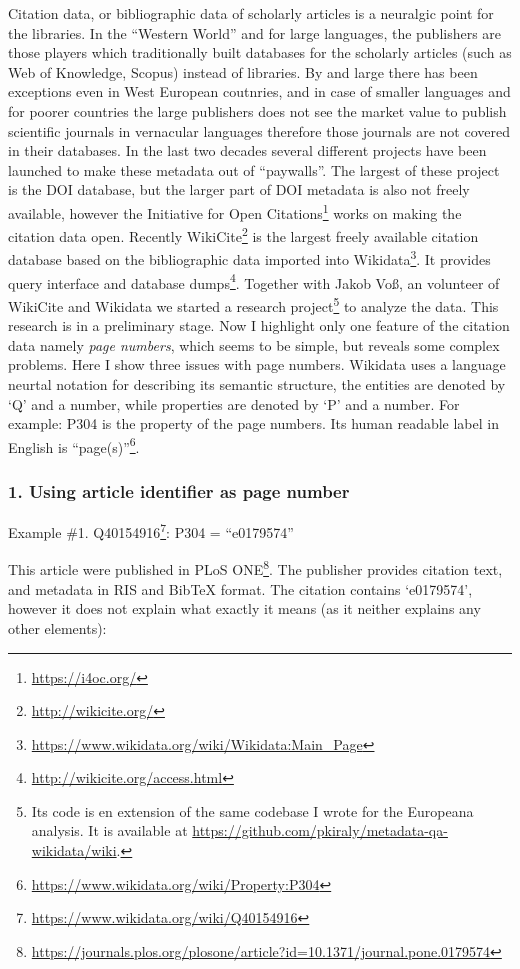 Citation data, or bibliographic data of scholarly articles is a neuralgic point for the libraries. In the ``Western World'' and for large languages, the publishers are those players which traditionally built databases for the scholarly articles (such as Web of Knowledge, Scopus) instead of libraries. By and large there has been exceptions even in West European coutnries, and in case of smaller languages and for poorer countries the large publishers does not see the market value to publish scientific journals in vernacular languages therefore those journals are not covered in their databases. In the last two decades several different projects have been launched to make these metadata out of ``paywalls''. The largest of these project is the DOI database, but the larger part of DOI metadata is also not freely available, however the Initiative for Open Citations\footnote{\url{https://i4oc.org/}} works on making the citation data open. Recently WikiCite\footnote{\url{http://wikicite.org/}} is the largest freely available citation database based on the bibliographic data imported into Wikidata\footnote{\url{https://www.wikidata.org/wiki/Wikidata:Main_Page}}. It provides query interface and database dumps\footnote{\url{http://wikicite.org/access.html}}. Together with Jakob Voß, an volunteer of WikiCite and Wikidata we started a research project\footnote{Its code is en extension of the same codebase I wrote for the Europeana analysis. It is available at \url{https://github.com/pkiraly/metadata-qa-wikidata/wiki}.} to analyze the data. This research is in a preliminary stage. Now I highlight only one feature of the citation data namely \emph{page numbers}, which seems to be simple, but reveals some complex problems. Here I show three issues with page numbers. Wikidata uses a language neurtal notation for describing its semantic structure, the entities are denoted by `Q' and a number, while properties are denoted by `P' and a number. For example: P304 is the property of the page numbers. Its human readable label in English is ``page(s)''\footnote{\url{https://www.wikidata.org/wiki/Property:P304}}.

\subsubsection{1. Using article identifier as page number}

Example \#1. Q40154916\footnote{\url{https://www.wikidata.org/wiki/Q40154916}}: P304 = ``e0179574''

This article were published in PLoS ONE\footnote{\url{https://journals.plos.org/plosone/article?id=10.1371/journal.pone.0179574}}. The publisher provides citation text, and metadata in RIS and BibTeX format. The citation contains `e0179574', however it does not explain what exactly it means (as it neither explains any other elements):


